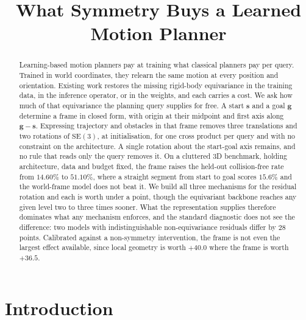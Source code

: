 \documentclass[conference]{IEEEtran}
\title{What Symmetry Buys a Learned Motion Planner}
\author{\IEEEauthorblockN{Anonymous Author}
\IEEEauthorblockA{Anonymous Affiliation}}
\begin{document}
\maketitle

\begin{abstract}
Learning-based motion planners pay at training what classical planners
pay per query. Trained in world coordinates, they relearn the same
motion at every position and orientation. Existing work restores the
missing rigid-body equivariance in the training data, in the inference
operator, or in the weights, and each carries a cost. We ask how much of
that equivariance the planning query supplies for free.
A start $\mathbf{s}$ and a goal $\mathbf{g}$ determine a frame in closed
form, with origin at their midpoint and first axis along
$\mathbf{g}-\mathbf{s}$. Expressing trajectory and obstacles in that
frame removes three translations and two rotations of $\mathrm{SE}(3)$,
at initialisation, for one cross product per query and with no
constraint on the architecture. A single rotation about the start-goal
axis remains, and no rule that reads only the query removes it. On a cluttered 3D
benchmark, holding architecture, data and budget fixed, the frame raises
the held-out collision-free rate from $14.60\%$ to $51.10\%$, where a
straight segment from start to goal scores $15.6\%$ and the world-frame
model does not beat it. We build all three mechanisms for the residual
rotation and each is worth under a point, though the equivariant
backbone reaches any given level two to three times sooner. What the
representation supplies therefore dominates what any mechanism enforces,
and the standard diagnostic does not see the difference: two models with
indistinguishable non-equivariance residuals differ by $28$ points.
Calibrated against a non-symmetry intervention, the frame is not even the
largest effect available, since local geometry is worth $+40.0$ where the
frame is worth $+36.5$.

\end{abstract}

\section{Introduction}
\end{document}
